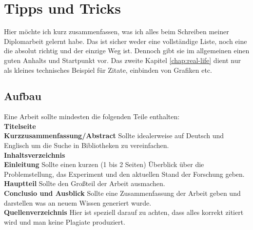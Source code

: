 \chapter{Tipps und Tricks}
Hier möchte ich kurz zusammenfassen, was ich alles beim Schreiben meiner Diplomarbeit gelernt habe. Das ist sicher weder eine vollständige Liste, noch eine die absolut richtig und der einzige Weg ist. Dennoch gibt sie im allgemeinen einen guten Anhalts und Startpunkt vor. Das zweite Kapitel \ref{chap:real-life} dient nur als kleines technisches Beispiel für Zitate, einbinden von Grafiken etc.
        \tagmcend
\tagstructend
\section{Aufbau}
Eine Arbeit sollte mindesten die folgenden Teile enthalten:\\
\textbf{Titelseite}\\
\textbf{Kurzzusammenfassung/Abstract} Sollte idealerweise auf Deutsch und Englisch um die Suche in Bibliotheken zu vereinfachen.\\
\textbf{Inhaltsverzeichnis}\\
\textbf{Einleitung} Sollte einen kurzen (1 bis 2 Seiten) Überblick über die Problemstellung, das Experiment und den aktuellen Stand der Forschung geben.\\
\textbf{Hauptteil} Sollte den Großteil der Arbeit ausmachen.\\
\textbf{Conclusio und Ausblick} Sollte eine Zusammenfassung der Arbeit geben und darstellen was an neuem Wissen generiert wurde.\\
\textbf{Quellenverzeichnis} Hier ist speziell darauf zu achten, dass alles korrekt zitiert wird und man keine Plagiate produziert.
        \tagmcend
\tagstructend

